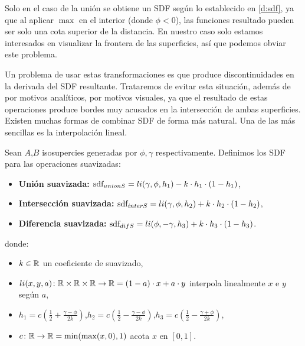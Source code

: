 \begin{observacion}
    Solo en el caso de la unión se obtiene un SDF según lo establecido en \autoref{d:sdf}, ya que al aplicar $\max$ en el interior (donde $\phi < 0$), las funciones resultado pueden ser solo una cota superior de la distancia. En nuestro caso solo estamos interesados en visualizar la frontera de las superficies, así que podemos obviar este problema.
\end{observacion}

Un problema de usar estas transformaciones es que produce discontinuidades en la derivada del SDF resultante. Trataremos de evitar esta situación, además de por motivos analíticos, por motivos visuales, ya que el resultado de estas operaciones produce bordes muy acusados en la intersección de ambas superficies. Existen muchas formas de combinar SDF de forma más natural. Una de las más sencillas es la interpolación lineal.

\begin{proposicion}
    Sean $A$,$B$ isosupercies generadas por $\phi,\gamma$ respectivamente. Definimos los SDF para las operaciones suavizadas:
    \begin{itemize}
        \item \textbf{Unión suavizada: } $\text{sdf}_{unionS} = li(\gamma, \phi, h_1) - k\cdot h_1 \cdot (1-h_1)$,
        \item \textbf{Intersección suavizada: } $\text{sdf}_{interS} = li(\gamma, \phi, h_2) + k\cdot h_2 \cdot (1-h_2)$,
        \item \textbf{Diferencia suavizada: } $\text{sdf}_{difS} = li(\phi, -\gamma, h_3) + k\cdot h_3 \cdot (1-h_3)$.
    \end{itemize}

    donde:
    \begin{itemize}
        \item $k\in \mathbb{R}$ un coeficiente de suavizado,
        \item $li(x,y,a)\colon \mathbb{R}\times\mathbb{R}\times\mathbb{R}\to \mathbb{R} = (1-a)\cdot x + a\cdot y$ interpola linealmente $x$ e $y$ según $a$,
        \item $h_1 = c\left(\frac{1}{2} + \frac{\gamma - \phi}{2k}\right)$,\quad $h_2 = c\left( \frac{1}{2} - \frac{\gamma - \phi}{2k} \right)$,\quad $h_3 = c\left( \frac{1}{2} - \frac{\gamma + \phi}{2k}\right)$,
        \item $c\colon \mathbb{R}\to \mathbb{R} = \min(\max(x, 0), 1)$ acota $x$ en $[0,1]$.
    \end{itemize}
\end{proposicion}

